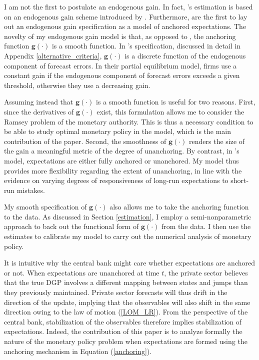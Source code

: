 \documentclass[11pt]{article}
\renewcommand{\[}{\begin{equation}}
\renewcommand{\]}{\end{equation}}
\begin{document}
I am not the first to postulate an endogenous gain. In fact, \cite{milani2014learning}'s estimation is based on an endogenous gain scheme introduced by \cite{marcet2003recurrent}. Furthermore, \cite{carvalho2019anchored} are the first to lay out an endogenous gain specification as a model of anchored expectations. The novelty of my endogenous gain model is that, as opposed to \cite{carvalho2019anchored}, the anchoring function $\mathbf{g}(\cdot)$ is a smooth function. In \cite{carvalho2019anchored}'s specification, discussed in detail in Appendix \ref{alternative_criteria}, $\mathbf{g}(\cdot)$ is a discrete function of the endogenous component of forecast errors. In their partial equilibrium model, firms use a constant gain if the endogenous component of forecast errors exceeds a given threshold, otherwise they use a decreasing gain. 

Assuming instead that $\mathbf{g}(\cdot)$ is a smooth function is useful for two reasons. First, since the derivatives of $\mathbf{g}(\cdot)$ exist, this formulation allows me to consider the Ramsey problem of the monetary authority. This is thus a necessary condition to be able to study optimal monetary policy in the model, which is the main contribution of the paper. Second, the smoothness of $\mathbf{g}(\cdot)$ renders the size of the gain a meaningful metric of the degree of unanchoring. By contrast, in \cite{carvalho2019anchored}'s model, expectations are either fully anchored or unanchored. My model thus provides more flexibility regarding the extent of unanchoring, in line with the evidence on varying degrees of responsiveness of long-run expectations to short-run mistakes. 

My smooth specification of $\mathbf{g}(\cdot)$ also allows me to take the anchoring function to the data. As discussed in Section \ref{estimation}, I employ a semi-nonparametric approach to back out the functional form of $\mathbf{g}(\cdot)$ from the data. I then use the estimates to calibrate my model to carry out the numerical analysis of monetary policy.


It is intuitive why the central bank might care whether expectations are anchored or not. When expectations are unanchored at time $t$, the private sector believes that the true DGP involves a different mapping between states and jumps than they previously maintained. Private sector forecasts will thus drift in the direction of the update, implying that the observables will also shift in the same direction owing to the law of motion (\ref{LOM_LR}). From the perspective of the central bank, stabilization of the observables therefore implies stabilization of expectations. Indeed, the contribution of this paper is to analyze formally the nature of the monetary policy problem when expectations are formed using the anchoring mechanism in Equation (\ref{anchoring}).
\end{document}
